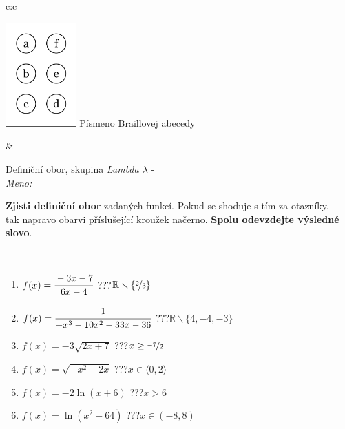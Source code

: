 \documentclass[10pt]{report}
\begin{document}
\begin{tabular}{c:c}
\begin{minipage}[c][104.5mm][t]{0.5\linewidth}
\begin{center}
\begin{minipage}{0.20\linewidth}
\begin{center}
\includegraphics[height=40mm]{../images/braille.png}
{\small Písmeno Braillovej abecedy}
\end{center}
\end{minipage}
\end{center}
\end{minipage}
&
\begin{minipage}[c][104.5mm][t]{0.5\linewidth}
\begin{center}
\vspace{7mm}
{\huge Definiční obor, skupina \textit{Lambda $\lambda$} -}\\[5mm]
\textit{Meno:}\phantom{xxxxxxxxxxxxxxxxxxxxxxxxxxxxxxxxxxxxxxxxxxxxxxxxxxxxxxxxxxxxxxxxx}\\[5mm]
\begin{minipage}{0.95\linewidth}
\textbf{Zjisti definiční obor} zadaných funkcí. Pokud se shoduje s tím za otazníky,\\tak napravo obarvi příslušející kroužek načerno. \textbf{Spolu odevzdejte výsledné slovo}.
\end{minipage}
\\[1mm]
\begin{minipage}{0.79\linewidth}
\begin{center}
\begin{varwidth}{\linewidth}
\begin{enumerate}
\normalsizerrr
\item $f(x)=\cfrac{-3x-7}{6x-4}$\quad \dotfill\; ???\;\dotfill \quad $\mathbb{R}\smallsetminus\{\nicefrac{2}{3}\}$
\item $f(x)=\cfrac{1}{-x^3-10x^2-33x-36}$\quad \dotfill\; ???\;\dotfill \quad $\mathbb{R}\smallsetminus\{4,-4,-3\}$
\item $f(x)=-3\sqrt{2x+7}$\quad \dotfill\; ???\;\dotfill \quad $x\geq\nicefrac{-7}{2}$
\item $f(x)=\sqrt{-x^2-2x}$\quad \dotfill\; ???\;\dotfill \quad $x\in\langle0 , 2\rangle$
\item $f(x)=-2\ln{(x+6)}$\quad \dotfill\; ???\;\dotfill \quad $x>6$
\item $f(x)=\ln{(x^2-64)}$\quad \dotfill\; ???\;\dotfill \quad $x\in(-8 , 8)$

\end{enumerate}
\end{varwidth}
\end{center}
\end{minipage}
\end{center}
\end{minipage}
\end{tabular}
\end{document}
